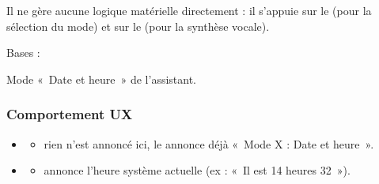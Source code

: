 \documentclass[letterpaper,10pt,french]{sphinxmanual}
\begin{document}
\sphinxAtStartPar
Il ne gère aucune logique matérielle directement : il s’appuie sur
le  (pour la sélection du mode) et sur le 
(pour la synthèse vocale).

\begin{fulllineitems}
\label{\detokenize{api/modes:modes.mode_datetime.ModeDateHeure}}
\pysigstartsignatures
\pysiglinewithargsret
{}
{}
{}
\pysigstopsignatures
\sphinxAtStartPar
Bases : {\hyperref[\detokenize{api/core:core.mode_base.Mode}]{}}

\sphinxAtStartPar
Mode « Date et heure » de l’assistant.


\subsubsection{Comportement UX}
\label{\detokenize{api/modes:comportement-ux}}\begin{itemize}
\item {} \begin{description}
\begin{itemize}
\item {} 
\sphinxAtStartPar
rien n’est annoncé ici, le  annonce déjà
« Mode X : Date et heure ».

\end{itemize}

\end{description}

\item {} \begin{description}
\begin{itemize}
\item {} 
\sphinxAtStartPar
annonce l’heure système actuelle (ex : « Il est 14 heures 32 »).

\end{itemize}

\end{description}


\end{itemize}
\end{fulllineitems}
\end{document}
